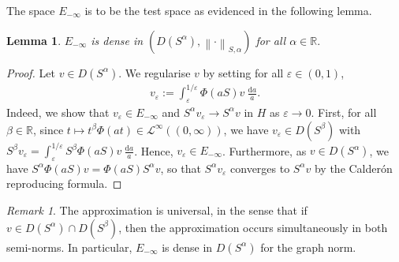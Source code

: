 \documentclass[11pt, letterpaper]{amsart}
\newtheorem{lem}[thm]{Lemma}
\theoremstyle{definition}
\theoremstyle{remark}
\newtheorem{rem}[thm]{Remark}
\numberwithin{equation}{section}
\begin{document}
The space $E_{-\infty}$ is to be the test space as evidenced in the following lemma.
 \begin{lem}\label{density E_infty}
     $E_{-\infty}$ is dense in $ (D(S^{\alpha}),  \left\| \cdot \right\|_{S,\alpha} )$ for all $\alpha \in \mathbb{R}.$
\end{lem}
\begin{proof}
Let $v \in D(S^\alpha)$. We regularise $v$ by setting for all $\varepsilon \in (0,1)$,
\begin{align*}
    v_\varepsilon := \int_{\varepsilon }^{1/\varepsilon } \Phi (aS)v \ \frac{\mathrm{d} a}{a}.
\end{align*}
Indeed, we show that $v_\varepsilon \in E_{-\infty}$ and $S^\alpha v_\varepsilon \to S^\alpha v$ in $H$ as $\varepsilon\to 0$. First, for all $\beta \in \mathbb{R}$, since {$t \mapsto t^\beta \Phi(at) \in \mathcal{L}^\infty((0,\infty))$}, we have $v_\varepsilon \in D(S^\beta)$ with $S^\beta v_\varepsilon = \int_{\varepsilon }^{1/\varepsilon } S^\beta \Phi (aS)v \ \frac{\mathrm{d} a}{a} $. Hence, $v_\varepsilon \in E_{-\infty}$. Furthermore, as $v \in D(S^\alpha)$, we have  $S^\alpha \Phi (aS)v= \Phi (aS)S^\alpha v$, so that $S^\alpha v_\varepsilon$ converges to $S^\alpha v$ by  the Calder\'on reproducing formula.
\end{proof} 

\begin{rem} The approximation is universal, in the sense that if $v\in D(S^\alpha) \cap D(S^\beta) $, then the approximation occurs simultaneously in both semi-norms. {In particular, $E_{-\infty}$ is dense in $D(S^\alpha)$ for the graph norm. }
    
\end{rem}
\end{document}
